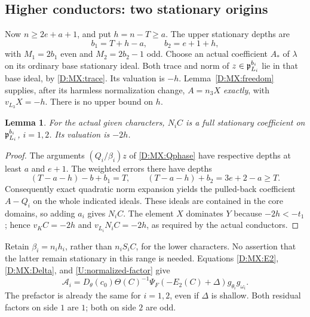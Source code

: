 \documentclass[11pt]{amsart}
\newtheorem{lemma}[theorem]{Lemma}
\theoremstyle{definition}
\theoremstyle{remark}
\begin{document}
\subsection{Higher conductors: two stationary origins}
Now $n\ge2e+a+1$, and put $h=n-T\ge a$.
The upper stationary depths are
\begin{equation}\label{D:MX:high-depths}
 b_1=T+h-a,\qquad b_2=e+1+h,
\end{equation}
with $M_1=2b_1$ even and $M_2=2b_2-1$ odd.
Choose an actual coefficient $A_*$ of $\lambda$ on its ordinary base
stationary ideal. Both trace and norm of $z\in\mathfrak p_{L_i}^{b_i}$ lie in
that base ideal, by \eqref{D:MX:trace}. Its valuation is $-h$.
Lemma~\ref{D:MX:freedom} supplies, after its harmless normalization change,
$A=n_3X$ \emph{exactly}, with $v_{L_3}X=-h$. There is no upper bound on $h$.

\begin{lemma}\label{D:MX:higher-coeff}
For the actual given characters, $N_iC$ is a full stationary coefficient
on $\mathfrak p_{L_i}^{b_i}$, $i=1,2$. Its valuation is $-2h$.
\end{lemma}
\begin{proof}
The arguments $(Q_i/\beta_i)z$ of \eqref{D:MX:Qphase} have respective depths
at least $a$ and $e+1$. The weighted errors there have depths
\[
 (T-a-h)-b+b_1=T,\qquad
 (T-a-h)+b_2=3e+2-a\ge T.
\]
Consequently exact quadratic norm expansion yields the pulled-back
coefficient $A-Q_i$ on the whole indicated ideals. These ideals are
contained in the core domains, so adding $a_i$ gives $N_iC$.
The element $X$ dominates $Y$ because $-2h<-t_1$; hence
$v_KC=-2h$ and $v_{L_i}N_iC=-2h$, as required by the actual conductors.
\end{proof}

Retain $\beta_i=n_i h_i$, rather than $n_iS_iC$, for the lower characters.
No assertion that the latter remain stationary in this range is needed.
Equations \eqref{D:MX:E2}, \eqref{D:MX:Delta}, and \eqref{U:normalized-factor} give
\begin{equation}\label{D:MX:higher-full}
 \mathcal A_i=D_\theta(c_0)\Theta(C)^{-1}
              \Psi_F(-E_2(C)+\Delta)g_{\theta_i}g_{\omega_i}.
\end{equation}
The prefactor is already the same for $i=1,2$, even if $\Delta$ is shallow.
Both residual factors on side $1$ are $1$; both on side $2$ are odd.
\end{document}

